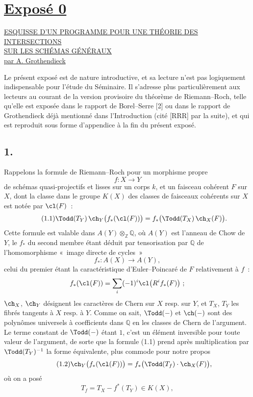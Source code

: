 \section*{\underline{Exposé 0}}
\begin{center}
\underline{\underline{ESQUISSE D'UN PROGRAMME POUR UNE THÉORIE DES INTERSECTIONS}}\\[3pt]
\underline{\underline{SUR LES SCHÉMAS GÉNÉRAUX}}\\[8pt]
\underline{par A. Grothendieck}
\end{center}

Le présent exposé est de nature introductive, et sa lecture n'est pas logiquement indispensable pour l'étude du Séminaire. Il s'adresse plus particulièrement aux lecteurs au courant de la version provisoire du théorème de Riemann--Roch, telle qu'elle est exposée dans le rapport de Borel--Serre [2] ou dans le rapport de Grothendieck déjà mentionné dans l'Introduction (cité [RRR] par la suite), et qui est reproduit sous forme d'appendice à la fin du présent exposé.

\subsection*{1.}
Rappelons la formule de Riemann--Roch pour un morphisme propre
\[
f:X\longrightarrow Y
\]
de schémas quasi-projectifs et lisses sur un corps $k$, et un faisceau cohérent $F$ sur $X$, dont la classe dans le groupe $K(X)$ des classes de faisceaux cohérents sur $X$ est notée par $\cl(F)$~:
\begin{equation}\tag{1.1}
\Todd(T_Y)\,\ch_Y\bigl(f_*(\cl(F))\bigr)=f_*\bigl(\Todd(T_X)\,\ch_X(F)\bigr).
\end{equation}
Cette formule est valable dans $A(Y)\otimes_{\mathbb Z}\mathbb Q$, où $A(Y)$ est l'anneau de Chow de $Y$, le $f_*$ du second membre étant déduit par tensorisation par $\mathbb Q$ de l'homomorphisme «~image directe de cycles~»
\[
f_*:A(X)\longrightarrow A(Y),
\]
celui du premier étant la caractéristique d'Euler--Poincaré de $F$ relativement à $f$~:
\[
f_*(\cl(F))=\sum_i(-1)^i\cl\bigl(R^if_*(F)\bigr)~;
\]
$\ch_X$, $\ch_Y$ désignent les caractères de Chern sur $X$ resp. sur $Y$, et $T_X$, $T_Y$ les fibrés tangents à $X$ resp. à $Y$. Comme on sait, $\Todd(-)$ et $\ch(-)$ sont des polynômes universels à coefficients dans $\mathbb Q$ en les classes de Chern de l'argument. Le terme constant de $\Todd(-)$ étant $1$, c'est un élément inversible pour toute valeur de l'argument, de sorte que la formule (1.1) prend après multiplication par $\Todd(T_Y)^{-1}$ la forme équivalente, plus commode pour notre propos
\begin{equation}\tag{1.2}
\ch_Y\bigl(f_*(\cl(F))\bigr)=f_*\bigl(\Todd(T_f)\cdot\ch_X(F)\bigr),
\end{equation}
où on a posé
\begin{equation}\tag{1.3}
T_f=T_X-f^*(T_Y)\in K(X),
\end{equation}
